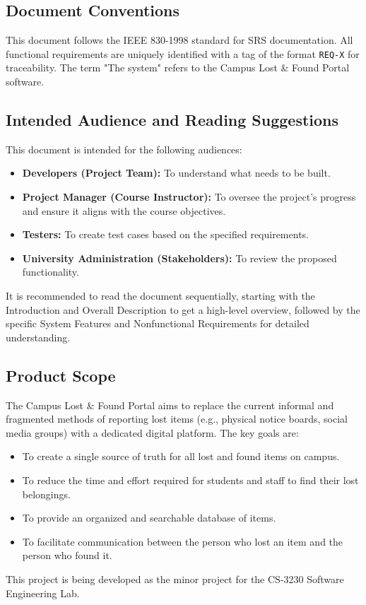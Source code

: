 \documentclass[11pt, a4paper]{article}
\begin{document}
\subsection{Document Conventions}
This document follows the IEEE 830-1998 standard for SRS documentation. All functional requirements are uniquely identified with a tag of the format \texttt{REQ-X} for traceability. The term "The system" refers to the Campus Lost \& Found Portal software.

\subsection{Intended Audience and Reading Suggestions}
This document is intended for the following audiences:
\begin{itemize}
    \item \textbf{Developers (Project Team):} To understand what needs to be built.
    \item \textbf{Project Manager (Course Instructor):} To oversee the project's progress and ensure it aligns with the course objectives.
    \item \textbf{Testers:} To create test cases based on the specified requirements.
    \item \textbf{University Administration (Stakeholders):} To review the proposed functionality.
\end{itemize}
It is recommended to read the document sequentially, starting with the Introduction and Overall Description to get a high-level overview, followed by the specific System Features and Nonfunctional Requirements for detailed understanding.

\subsection{Product Scope}
The Campus Lost \& Found Portal aims to replace the current informal and fragmented methods of reporting lost items (e.g., physical notice boards, social media groups) with a dedicated digital platform. The key goals are:
\begin{itemize}
    \item To create a single source of truth for all lost and found items on campus.
    \item To reduce the time and effort required for students and staff to find their lost belongings.
    \item To provide an organized and searchable database of items.
    \item To facilitate communication between the person who lost an item and the person who found it.
\end{itemize}
This project is being developed as the minor project for the CS-3230 Software Engineering Lab.
\end{document}

